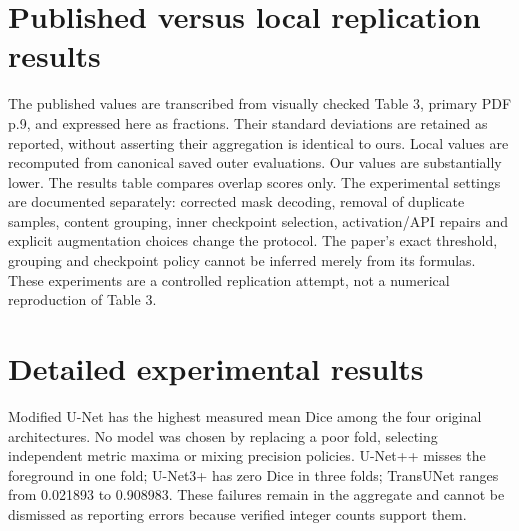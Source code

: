 \documentclass[a4paper,fleqn]{cas-sc}
\begin{document}
\section{Published versus local replication results}

The published values are transcribed from visually checked Table 3, primary PDF p.9, and expressed here as fractions. Their standard deviations are retained as reported, without asserting their aggregation is identical to ours. Local values are recomputed from canonical saved outer evaluations. Our values are substantially lower. The results table compares overlap scores only. The experimental settings are documented separately: corrected mask decoding, removal of duplicate samples, content grouping, inner checkpoint selection, activation/API repairs and explicit augmentation choices change the protocol. The paper's exact threshold, grouping and checkpoint policy cannot be inferred merely from its formulas. These experiments are a controlled replication attempt, not a numerical reproduction of Table 3.

\section{Detailed experimental results}




Modified U-Net has the highest measured mean Dice among the four original architectures. No model was chosen by replacing a poor fold, selecting independent metric maxima or mixing precision policies. U-Net++ misses the foreground in one fold; U-Net3+ has zero Dice in three folds; TransUNet ranges from 0.021893 to 0.908983. These failures remain in the aggregate and cannot be dismissed as reporting errors because verified integer counts support them.
\end{document}
